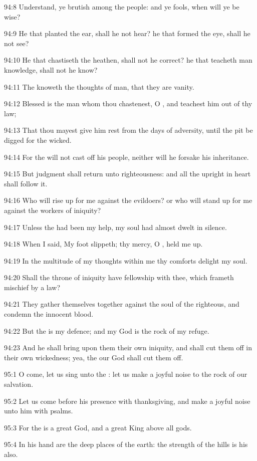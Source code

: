 94:8 Understand, ye brutish among the people: and ye fools, when will ye be wise?

94:9 He that planted the ear, shall he not hear? he that formed the eye, shall he not see?

94:10 He that chastiseth the heathen, shall not he correct? he that teacheth man knowledge, shall not he know?

94:11 The \LORD knoweth the thoughts of man, that they are vanity.

94:12 Blessed is the man whom thou chastenest, O \LORD, and teachest him out of thy law;

94:13 That thou mayest give him rest from the days of adversity, until the pit be digged for the wicked.

94:14 For the \LORD will not cast off his people, neither will he forsake his inheritance.

94:15 But judgment shall return unto righteousness: and all the upright in heart shall follow it.

94:16 Who will rise up for me against the evildoers? or who will stand up for me against the workers of iniquity?

94:17 Unless the \LORD had been my help, my soul had almost dwelt in silence.

94:18 When I said, My foot slippeth; thy mercy, O \LORD, held me up.

94:19 In the multitude of my thoughts within me thy comforts delight my soul.

94:20 Shall the throne of iniquity have fellowship with thee, which frameth mischief by a law?

94:21 They gather themselves together against the soul of the righteous, and condemn the innocent blood.

94:22 But the \LORD is my defence; and my God is the rock of my refuge.

94:23 And he shall bring upon them their own iniquity, and shall cut them off in their own wickedness; yea, the \LORD our God shall cut them off.



95:1 O come, let us sing unto the \LORD: let us make a joyful noise to the rock of our salvation.

95:2 Let us come before his presence with thanksgiving, and make a joyful noise unto him with psalms.

95:3 For the \LORD is a great God, and a great King above all gods.

95:4 In his hand are the deep places of the earth: the strength of the hills is his also.

